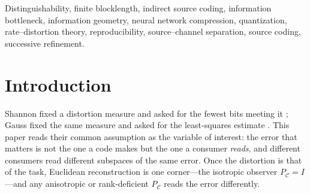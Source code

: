 \documentclass[lettersize,onecolumn]{IEEEtran}
\theoremstyle{definition}
\theoremstyle{remark}
\newcommand{\PC}{P_{\mathcal{C}}}
\begin{document}
\begin{IEEEkeywords}
Distinguishability, finite blocklength, indirect source coding, information bottleneck,
information geometry, neural network compression, quantization, rate--distortion theory,
reproducibility, source--channel separation, source coding, successive refinement.
\end{IEEEkeywords}

\IEEEpeerreviewmaketitle

\section{Introduction}

Shannon fixed a distortion measure and asked for the fewest bits meeting it
\cite{shannon1948,shannon1959}; Gauss fixed the same measure and asked for the
least-squares estimate \cite{gauss1809}. This paper reads their common assumption
as the variable of interest: the error that matters is not the one a code makes but
the one a consumer \emph{reads}, and different consumers read different subspaces of
the same error. Once the distortion is that of the task, Euclidean reconstruction is one
corner---the isotropic observer $\PC=I$---and any anisotropic or rank-deficient $\PC$
reads the error differently.
\end{document}
